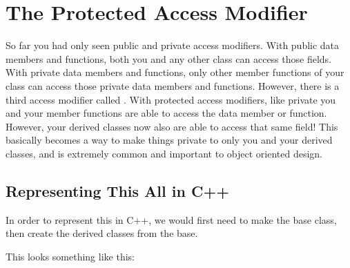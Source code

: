 \documentclass{tufte-handout}
\begin{document}
\section{The Protected Access Modifier}
So far you had only seen public and private access modifiers.
With public data members and functions, both you and any other class can access those fields.
With private data members and functions, only other member functions of your class can access those private data members and functions.
However, there is a third access modifier called .
With protected access modifiers, like private you and your member functions are able to access the data member or function.
However, your derived classes now also are able to access that same field!
This basically becomes a way to make things private to only you and your derived classes, and is extremely common and important to object oriented design.

\subsection{Representing This All in C++}
In order to represent this in C++, we would first need to make the  base class, then create the derived classes from the  base.

This looks something like this:
\end{document}
